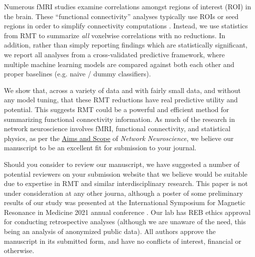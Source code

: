 \documentclass[10pt,a4paper]{article}
\begin{document}
Numerous fMRI studies examine correlations amongst regions of interest (ROI) in the brain. These
``functional connectivity'' analyses typically use ROIs or seed regions in order to simplify
connectivity computations \citep{huettelFunctionalMagneticResonance2004}. Instead, we use
statistics from RMT to summarize \emph{all} voxelwise correlations with no reductions. In
addition, rather than simply reporting findings which are statistically significant, we report all
analyses from a cross-validated predictive framework, where multiple machine learning models are
compared against both each other and proper baselines (e.g. naive / dummy classifiers).

We show that, across a variety of data and with fairly small data, and without any model tuning,
that these RMT reductions have real predictive utility and potential. This suggests RMT could
be a powerful and efficient method for summarizing functional connectivity information. As much of the
research in network neuroscience involves fMRI, functional connectivity, and statistical physics, as
per the \href{https://direct.mit.edu/netn/pages/submission-guidelines#aims}{Aims and Scope} of \emph{Network
Neuroscience}, we believe our manuscript to be an excellent fit for submission to your journal.

Should you consider to review our manuscript, we have suggested a number of potential reviewers on
your submission website that we believe would be suitable due to expertise in RMT and similar
interdisciplinary research. This paper is not under consideration at any other journa, although a
poster of some preliminary results of our study was presented at the International Symposium for
Magnetic Resonance in Medicine 2021 annual conference \citep{bergerOpenSourceRandom2021}. Our lab
has REB ethics approval for conducting retrospective analyses (although we are unaware of the need,
this being an analysis of anonymized public data). All authors approve the manuscript in its
submitted form, and have no conflicts of interest, financial or otherwise.
\end{document}
